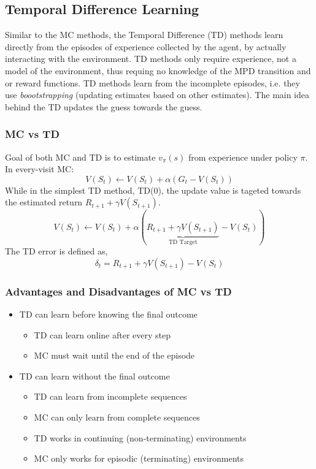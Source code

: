 \subsection{Temporal Difference Learning}
Similar to the MC methods, the Temporal Difference (TD) methods learn directly from the
episodes of experience collected by the agent, by actually interacting with the environment.
TD methods only require experience, not a model of the environment, thus requing no knowledge
of the MPD transition and or reward functions. TD methods learn from the incomplete episodes,
i.e. they use \emph{boootstrapping} (updating estimates based on other estimates). The main
idea behind the TD updates the guess towards the guess.

\subsubsection*{MC vs TD}
Goal of both MC and TD is to estimate \(v_{\pi}(s)\) from experience under policy \(\pi\).
In every-visit MC:
\[
    V(S_t) \leftarrow V(S_t) + \alpha\left( 
        G_t - V(S_t)
     \right)      
\]
While in the simplest TD method, TD(0), the update value is tageted towards the estimated
return \(R_{t+1} + \gamma V(S_{t+1})\).
\[
    V(S_t) \leftarrow V(S_t) + \alpha\left( 
        \underset{\text{TD Target} }{\underbrace{R_{t+1} + \gamma V(S_{t+1})}}
        - V(S_t)
     \right)
\]
The TD error is defined as,
\[
    \delta_t = R_{t+1} + \gamma V(S_{t+1}) - V(S_t)
\]

\subsubsection{Advantages and Disadvantages of MC vs TD}
\begin{itemize}
    \item  TD can learn before knowing the final outcome
    \begin{itemize}
        \item TD can learn online after every step
        \item MC must wait until the end of the episode
    \end{itemize}
    \item TD can learn without the final outcome
    \begin{itemize}
        \item TD can learn from incomplete sequences
        \item MC can only learn from complete sequences
        \item TD works in continuing (non-terminating) environments
        \item MC only works for episodic (terminating) environments
    \end{itemize}
\end{itemize}


